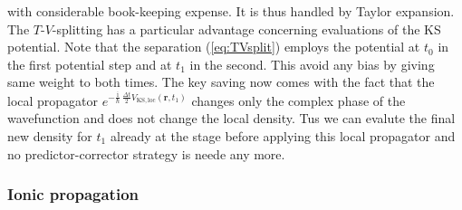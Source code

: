 \documentclass[final,1p]{elsarticle}
\newcommand{\I}{\mathrm{i}}
\begin{document}
with considerable book-keeping expense. It is thus handled by Taylor
expansion. The $T$-$V$-splitting has a particular advantage concerning
evaluations of the KS potential. Note that the separation
(\ref{eq:TVsplit}) employs the potential at $t_0$ in the first
potential step and at $t_1$ in the second. This avoid any bias by
giving same weight to both times. The key saving now comes with the
fact that the local propagator
$e^{-\frac{\I}{\hbar}\,\frac{\Delta{t}}{2}{V}_\mathrm{KS,loc}(\mathbf{r},t_1)}$
changes only the complex phase of the wavefunction and does not change
the local density. Tus we can evalute the final new density for $t_1$
already at the stage before applying this local propagator
and no predictor-corrector strategy is neede any more.


\subsubsection{Ionic propagation}
\label{sec:numdynion}
\end{document}

